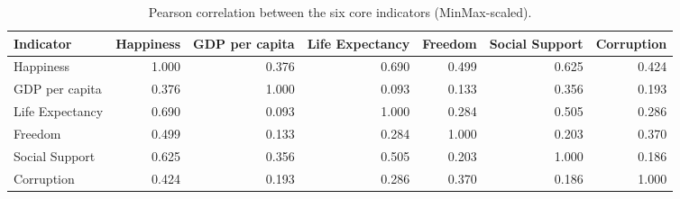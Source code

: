 \begin{table}
\caption{Pearson correlation between the six core indicators (MinMax-scaled).}
\label{tab:correlation}
\begin{tabular}{lrrrrrr}
\toprule
Indicator & Happiness & GDP per capita & Life Expectancy & Freedom & Social Support & Corruption \\
\midrule
Happiness & 1.000 & 0.376 & 0.690 & 0.499 & 0.625 & 0.424 \\
GDP per capita & 0.376 & 1.000 & 0.093 & 0.133 & 0.356 & 0.193 \\
Life Expectancy & 0.690 & 0.093 & 1.000 & 0.284 & 0.505 & 0.286 \\
Freedom & 0.499 & 0.133 & 0.284 & 1.000 & 0.203 & 0.370 \\
Social Support & 0.625 & 0.356 & 0.505 & 0.203 & 1.000 & 0.186 \\
Corruption & 0.424 & 0.193 & 0.286 & 0.370 & 0.186 & 1.000 \\
\bottomrule
\end{tabular}
\end{table}
